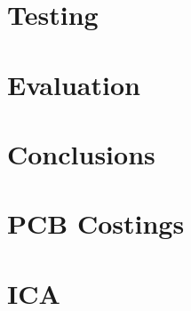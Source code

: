 \documentclass[a4paper, 12pt]{report}
\begin{document}


\chapter{Testing}

\chapter{Evaluation}

\chapter{Conclusions}




\appendix
\chapter{PCB Costings}

\chapter{ICA}

\end{document}
